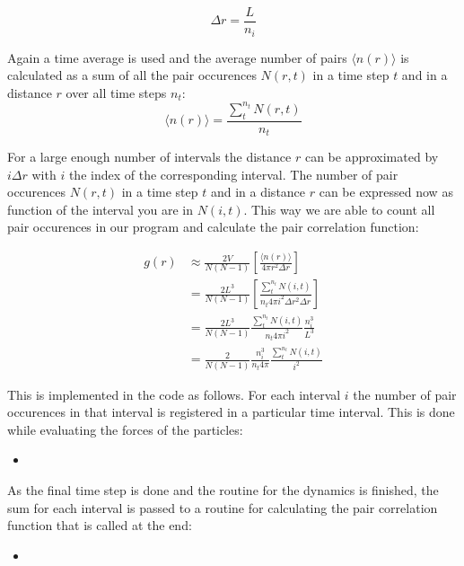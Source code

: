 \documentclass[
10pt, %
a4paper, %
oneside, %
headinclude,footinclude, %
BCOR5mm, %
]{scrartcl}
\newcommand{\insertcode}[2]{\begin{itemize}\item[]\end{itemize}} %
\begin{document}
$$ \Delta r  = \frac{L}{n_i} $$

\noindent
Again a time average is used and the average number of pairs $\langle n(r) \rangle $ is calculated as a sum of all the pair occurences $N(r,t)$ in a time step $t$ and in a distance $r$ over all time steps $n_t$:
$$ \langle n(r) \rangle = \frac{\sum_t^{n_t} N(r,t)}{n_t} $$

\noindent
For a large enough number of intervals the distance $r$ can be approximated by $i\Delta r$ with $i$ the index of the corresponding interval. The number of pair occurences $N(r,t)$ in a time step $t$ and in a distance $r$ can be expressed now as function of the interval you are in $N(i,t)$. This way we are able to count all pair occurences in our program and calculate the pair correlation function:

\begin{align}
g(r) &\approx \frac{2V}{N(N-1)} \left [ \frac{\langle n(r) \rangle }{ 4 \pi r^2 \Delta r} \right ] \\
&= \frac{2L^3}{N(N-1)} \left [ \frac{\sum_t^{n_t} N(i,t)}{n_t 4 \pi i^2 \Delta r^2 \Delta r} \right ] \\
&= \frac{2L^3}{N(N-1)} \frac{\sum_t^{n_t} N(i,t)}{n_t 4 \pi i^2} \frac{n_i^3}{L^3} \\
&= \frac{2}{N(N-1)} \frac{n_i^3}{n_t 4 \pi} \frac{\sum_t^{n_t} N(i,t)}{i^2}
\end{align}

\noindent
This is implemented in the code as follows. For each interval $i$ the number of pair occurences in that interval is registered in a particular time interval. This is done while evaluating the forces of the particles:
\insertcode{"Scripts/pair_correlation_snippet_1.f90"}{Updating the histogram for each interval} %

\noindent
As the final time step is done and the routine for the dynamics is finished, the sum for each interval is passed to a routine for calculating the pair correlation function that is called at the end:
\insertcode{"Scripts/pair_correlation_snippet_2.f90"}{Factors are needed to prevent overflow errors} %








\newpage
\end{document}
